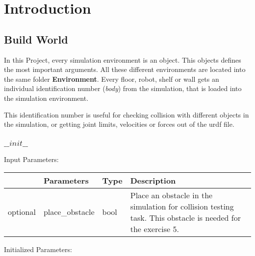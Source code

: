 \documentclass[
	ngerman,
	accentcolor=9c,%
	type=intern,
	marginpar=false
	]{tudapub}
\begin{document}
\newpage
\section{Introduction}
\subsection{Build World}
In this Project, every simulation environment is an object. This objects defines the most important arguments. All these  different environments are located into the same folder \textbf{Environment}. Every floor, robot, shelf or wall gets an individual identification number (\textit{body}) from the simulation, that is loaded into the simulation environment.

\vspace{0.5cm}
\noindent This identification number is useful for checking collision with different objects in the simulation, or getting joint limits, velocities or forces out of the urdf file.   


\vspace{0.5cm}

\subsubsection{$\_\_init\_\_$}
\noindent Input Parameters:
\vspace{0.5cm}


\begin{tabular}{|p{}|p{}|p{}| p{}|}
\hline
 & \textbf{Parameters} & \textbf{Type} & \textbf{Description} \\
\hline
optional & place\_obstacle & bool & Place an obstacle in the simulation for collision testing task. This obstacle is needed for the exercise 5.   \\
\hline
\end{tabular}

\vspace{0.5cm}

\noindent Initialized Parameters:

\vspace{0.5cm}
\end{document}
